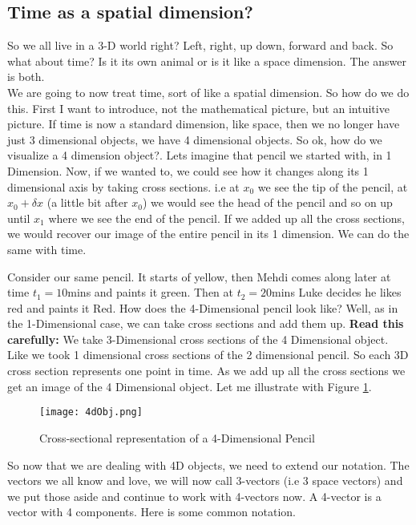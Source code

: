 \subsection{Time as a spatial dimension?}

So we all live in a 3-D world right? Left, right, up down, forward and back. So what about time? Is it its own animal or is it like a space dimension. The answer is both. \\

We are going to now treat time, sort of like a spatial dimension. So how do we do this. First I want to introduce, not the mathematical picture, but an intuitive picture. If time is now a standard dimension, like space, then we no longer have just 3 dimensional objects, we have 4 dimensional objects. So ok, how do we visualize a 4 dimension object?. Lets imagine that pencil we started with, in 1 Dimension. Now, if we wanted to, we could see how it changes along its 1 dimensional axis by taking cross sections. i.e at $x_0$ we see the tip of the pencil, at $x_0+ \delta x$ (a little bit after $x_0$) we would see the head of the pencil and so on up until $x_1$ where we see the end of the pencil. If we added up all the cross sections, we would recover our image of the entire pencil in its 1 dimension. We can do the same with time. 

Consider our same pencil. It starts of yellow, then Mehdi comes along later at time $t_1=10$mins and paints it green. Then at $t_2=20$mins Luke decides he likes red and paints it Red. How does the 4-Dimensional pencil look like? Well, as in the 1-Dimensional case, we can take cross sections and add them up. \textbf{Read this carefully:} We take 3-Dimensional cross sections of the 4 Dimensional object. Like we took 1 dimensional cross sections of the 2 dimensional pencil. So each 3D cross section represents one point in time. As we add up all the cross sections we get an image of the 4 Dimensional object. Let me illustrate with Figure \ref{fig:4dobj}. 

\begin{figure}[h]
\centering
\texttt{[image: 4dObj.png]}
\caption{Cross-sectional representation of a 4-Dimensional Pencil}
\label{fig:4dobj}
\end{figure}

So now that we are dealing with 4D objects, we need to extend our notation. The vectors we all know and love, we will now call 3-vectors (i.e 3 space vectors) and we put those aside and continue to work with 4-vectors now. A 4-vector is a vector with 4 components. Here is some common notation. 

